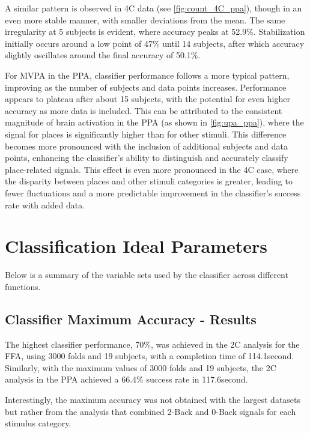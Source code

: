 A similar pattern is observed in \gls{4C} data (see \autoref{fig:count_4C_ppa}), though in an even more stable manner, with smaller deviations from the mean. The same irregularity at 5 subjects is evident, where accuracy peaks at 52.9\%. Stabilization initially occurs around a low point of 47\% until 14 subjects, after which accuracy slightly oscillates around the final accuracy of 50.1\%.

For \gls{MVPA} in the \gls{PPA}, classifier performance follows a more typical pattern, improving as the number of subjects and data points increases. Performance appears to plateau after about 15 subjects, with the potential for even higher accuracy as more data is included. This can be attributed to the consistent magnitude of brain activation in the \gls{PPA} (as shown in \autoref{fig:upa_ppa}), where the signal for places is significantly higher than for other stimuli. This difference becomes more pronounced with the inclusion of additional subjects and data points, enhancing the classifier's ability to distinguish and accurately classify place-related signals. This effect is even more pronounced in the \gls{4C} case, where the disparity between places and other stimuli categories is greater, leading to fewer fluctuations and a more predictable improvement in the classifier's success rate with added data.








\section{Classification Ideal Parameters}

Below is a summary of the variable sets used by the classifier across different functions.

\subsection{Classifier Maximum Accuracy - Results}

The highest classifier performance, 70\%, was achieved in the \gls{2C} analysis for the \gls{FFA}, using 3000 folds and 19 subjects, with a completion time of 114.1\si{second}. Similarly, with the maximum values of 3000 folds and 19 subjects, the \gls{2C} analysis in the \gls{PPA} achieved a 66.4\% success rate in 117.6\si{second}.

Interestingly, the maximum accuracy was not obtained with the largest datasets but rather from the analysis that combined 2-Back and 0-Back signals for each stimulus category.

